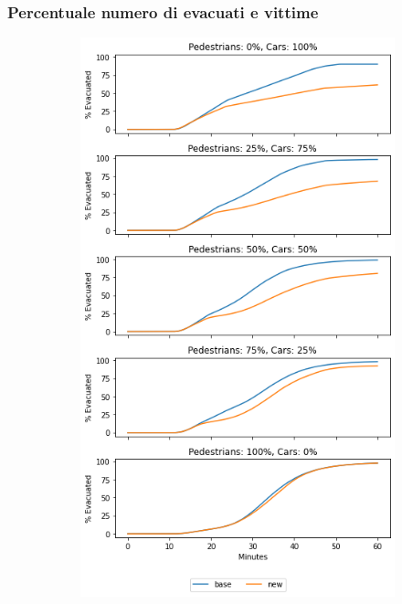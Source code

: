 \subsubsection*{Percentuale numero di evacuati e vittime}

\begin{figure}[ht]
    \centering
    \begin{subfigure}{0.45\textwidth}
        \centering
        \includegraphics[width=\textwidth]{images/analisi/comparison-total-evacuated.png}

\end{subfigure}
\end{figure}
